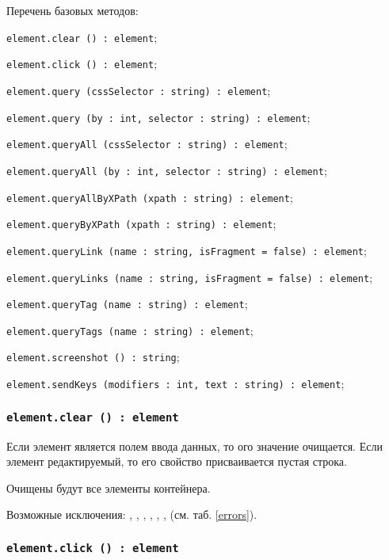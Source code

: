 Перечень базовых методов:
\begin{icItems}
    \item \lstinline|element.clear () : element|;
	\item \lstinline|element.click () : element|;
	\item \lstinline|element.query (cssSelector : string) : element|;
	\item \lstinline|element.query (by : int, selector : string) : element|;
	\item \lstinline|element.queryAll (cssSelector : string) : element|;
	\item \lstinline|element.queryAll (by : int, selector : string) : element|;
	\item \lstinline|element.queryAllByXPath (xpath : string) : element|;
	\item \lstinline|element.queryByXPath (xpath : string) : element|;
	\item \lstinline|element.queryLink (name : string, isFragment = false) : element|;
	\item \lstinline|element.queryLinks (name : string, isFragment = false) : element|;
	\item \lstinline|element.queryTag (name : string) : element|;
	\item \lstinline|element.queryTags (name : string) : element|;
	\item \lstinline|element.screenshot () : string|;
	\item \lstinline|element.sendKeys (modifiers : int, text : string) : element|;
\end{icItems}

\subsubsection{\lstinline|element.clear () : element|}

Если элемент является полем ввода данных, то ого значение очищается. Если элемент редактируемый, то его свойство  присваивается пустая строка.

\code{[icL]} Очищены будут все элементы контейнера.

Возможные исключения: , , , , , ,  (см. таб. \ref{errors}).

\subsubsection{\lstinline|element.click () : element|}

